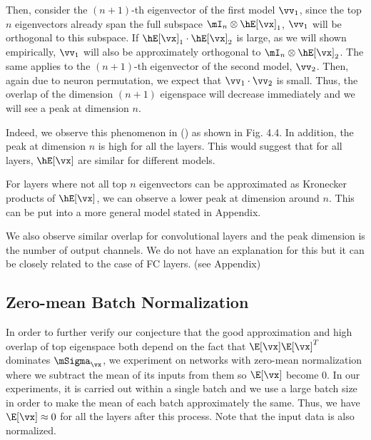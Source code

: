 Then, consider the $(n+1)$-th eigenvector of the first model $\vv_1$, since the top $n$ eigenvectors already span the full subspace $\mI_n \otimes \hE[\vx]_1$, $\vv_1$ will be orthogonal to this subspace. If $\hE[\vx]_1 \cdot \hE[\vx]_2$ is large, as we will shown empirically, $\vv_1$ will also be approximately orthogonal to $\mI_n \otimes \hE[\vx]_2$. The same applies to the $(n+1)$-th eigenvector of the second model, $\vv_2$. Then, again due to neuron permutation, we expect that $\vv_1 \cdot \vv_2$ is small. Thus, the overlap of the dimension $(n+1)$ eigenspace will decrease immediately and we will see a peak at dimension $n$. 

Indeed, we observe this phenomenon in () as shown in Fig. 4.4. In addition, the peak at dimension $n$ is high for all the layers. This would suggest that for all layers, $\hE[\vx]$ are similar for different models.

For layers where not all top $n$ eigenvectors can be approximated as Kronecker products of $\hE[\vx]$, we can observe a lower peak at dimension around $n$. This can be put into a more general model stated in Appendix.

We also observe similar overlap for convolutional layers and the peak dimension is the number of output channels. We do not have an explanation for this but it can be closely related to the case of FC layers. (see Appendix)

\subsection{Zero-mean Batch Normalization}

In order to further verify our conjecture that the good approximation and high overlap of top eigenspace both depend on the fact that $\E[\vx]\E[\vx]^T$ dominates $\mSigma_\vx$, we experiment on networks with zero-mean normalization where we subtract the mean of its inputs from them so $\E[\vx]$ become 0. In our experiments, it is carried out within a single batch and we use a large batch size in order to make the mean of each batch approximately the same. Thus, we have $\E[\vx] \approx 0$ for all the layers after this process. Note that the input data is also normalized.

